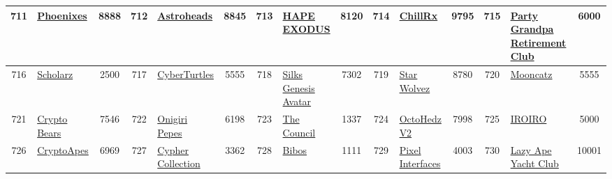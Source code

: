\begin{table*}[]
{\begin{tabular}{|c|l|c|c|l|c|c|l|c|c|l|c|c|l|c|}
        711   & \href{https://phoenixes.habitnest.com}{Phoenixes}                                  & 8888              & 712   & \href{https://www.astroheadsnft.io/}{Astroheads}                                                  & 8845              & 713   & \href{https://exohape.com}{HAPE EXODUS}                                           & 8120              & 714   & \href{https://chillrx.io}{ChillRx}                                            & 9795              & 715   & \href{http://retirementclubnft.com}{Party Grandpa Retirement Club}                        & 6000                                    \\ \hline
        716   & \href{http://www.scholarz.io}{Scholarz}                                            & 2500              & 717   & \href{https://opensea.io/collection/cyberturtles-genesis}{CyberTurtles}                           & 5555              & 718   & \href{https://silks.io}{Silks Genesis Avatar}                                     & 7302              & 719   & \href{http://starwolvez.com}{Star Wolvez}                                     & 8780              & 720   & \href{http://mooncatz.io}{Mooncatz}                                                       & 5555                                    \\ \hline
        721   & \href{https://www.cryptobullsociety.com/}{Crypto Bears}                            & 7546              & 722   & \href{http://onigiri-pepes.com}{Onigiri Pepes}                                                    & 6198              & 723   & \href{https://opensea.io/collection/1337council}{The Council}                     & 1337              & 724   & \href{https://octohedz.com/}{OctoHedz V2}                                     & 7998              & 725   & \href{https://iroiro.world/}{IROIRO}                                                      & 5000                                    \\ \hline
        726   & \href{https://opensea.io/collection/cryptoapes-official}{CryptoApes}               & 6969              & 727   & \href{https://cypher.collider.gg/}{Cypher Collection}                                             & 3362              & 728   & \href{http://bibos.xyz}{Bibos}                                                    & 1111              & 729   & \href{https://pixelinterfaces.com}{Pixel Interfaces}                          & 4003              & 730   & \href{http://www.lazyapeyachtclub.com}{Lazy Ape Yacht Club}                               & 10001                                   \\ \hline

\end{tabular}}
\end{table*}
